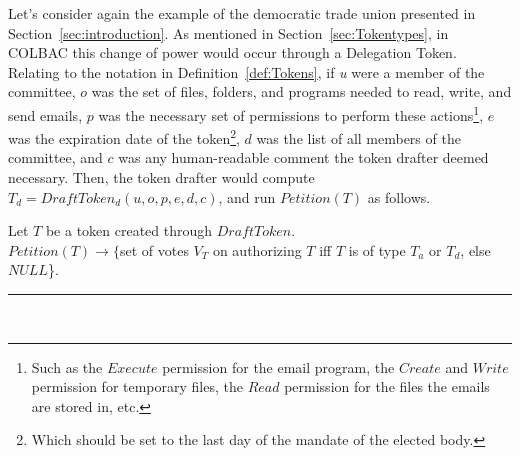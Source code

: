 Let's consider again the example of the democratic trade union presented in
Section~\ref{sec:introduction}. As mentioned in Section~\ref{sec:Tokentypes},
in COLBAC this change of power would occur through a Delegation Token. Relating
to the notation in Definition~\ref{def:Tokens}, if \textit{u} were a member of
the committee, $o$ was the set of files, folders, and programs needed to read,
write, and send emails, $p$ was the necessary set of permissions to perform
these actions\footnote{Such as the $Execute$ permission for the email program,
the $Create$ and $Write$ permission for temporary files, the $Read$ permission
for the files the emails are stored in, etc.}, $e$ was the expiration date of
the token\footnote{Which should be set to the last day of the mandate of the
elected body.}, $d$ was the list of all members of the committee, and $c$ was
any human-readable comment the token drafter deemed necessary. Then, the token
drafter would compute $T_{d} = DraftToken_{d}(u,o,p,e,d,c)$, and run
$Petition(T)$ as follows.

\begin{definition}\label{def:petition}
Let $T$ be a token created through $DraftToken$.\\
$Petition(T) \rightarrow \{$set of votes $V_{T}$ on authorizing $T$ iff $T$ is
of type $T_{a}$ or $T_{d}$, else $NULL$\}.\\
\hrule \mbox{}\\
\end{definition}

